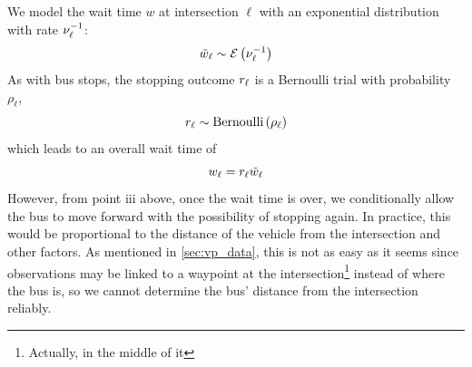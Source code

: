 We model the wait time $w$ at intersection $\ell$ with an exponential distribution with rate $\nu_\ell^{-1}$:
\begin{equation}
\label{eq:int_wait}
\tilde w_\ell \sim \mathcal{E}\left(\nu_\ell^{-1}\right)
\end{equation}
As with bus stops, the stopping outcome $r_\ell$ is a Bernoulli trial with probability $\rho_\ell$,
\begin{equation}
\label{eq:int_stop_bern}
r_\ell \sim \mathrm{Bernoulli}\left(\rho_\ell\right)
\end{equation}
which leads to an overall wait time of
\begin{equation}
\label{eq:int_total_wait}
w_\ell = r_\ell \tilde w_\ell
\end{equation}
However, from point iii above, once the wait time is over, we conditionally allow the bus to move forward with the possibility of stopping again. In practice, this would be proportional to the distance of the vehicle from the intersection and other factors. As mentioned in \cref{sec:vp_data}, this is not as easy as it seems since observations may be linked to a waypoint at the intersection\footnote{Actually, in the middle of it} instead of where the bus is, so we cannot determine the bus' distance from the intersection reliably.
